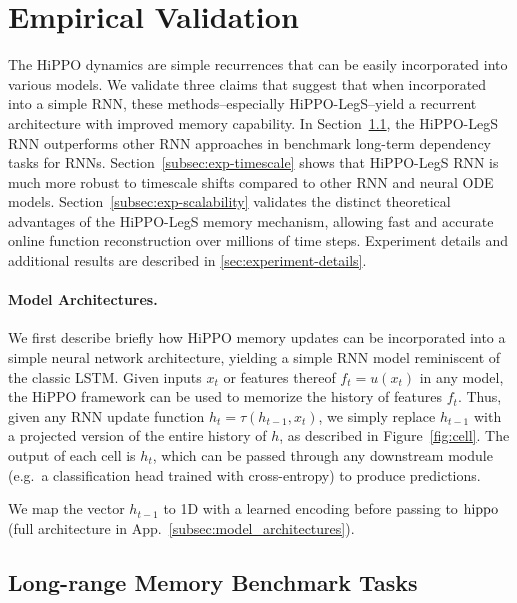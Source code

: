 
\section{Empirical Validation}
\label{sec:experiments}

The HiPPO dynamics are simple recurrences that can be easily incorporated into various models.
We validate three claims that suggest that when incorporated into a simple RNN, these methods--especially HiPPO-LegS--yield a recurrent architecture with improved memory capability.
In Section~\ref{subsec:membenchmark}, the HiPPO-LegS RNN outperforms
other RNN approaches in benchmark long-term dependency tasks for RNNs.
Section~\ref{subsec:exp-timescale} shows that HiPPO-LegS RNN is much more robust to
timescale shifts compared to other RNN and neural ODE models.
Section~\ref{subsec:exp-scalability} validates the distinct
theoretical advantages of the HiPPO-LegS memory mechanism, allowing fast and
accurate online function reconstruction over millions of time steps.
Experiment details and additional results are described in \cref{sec:experiment-details}.



\paragraph{Model Architectures.}
We first describe briefly how HiPPO memory updates can be incorporated into a
simple neural network architecture, yielding a simple RNN model reminiscent of
the classic LSTM.
Given inputs $x_t$ or features thereof $f_t = u(x_t)$ in any model, the HiPPO
framework can be used to memorize the history of features $f_t$.
Thus, given any RNN update function $h_{t} = \tau(h_{t-1}, x_t)$, we simply replace
$h_{t-1}$ with a projected version of the entire history of $h$, as described in
Figure~\ref{fig:cell}.
The output of each cell is $h_t$, which can be passed through any downstream module (e.g.\ a classification head trained with cross-entropy) to produce predictions.

We map the vector $h_{t-1}$ to 1D with a learned encoding before passing to
$\operatorname{hippo}$ (full architecture in App.~\ref{subsec:model_architectures}).


\subsection{Long-range Memory Benchmark Tasks}
\label{subsec:membenchmark}


